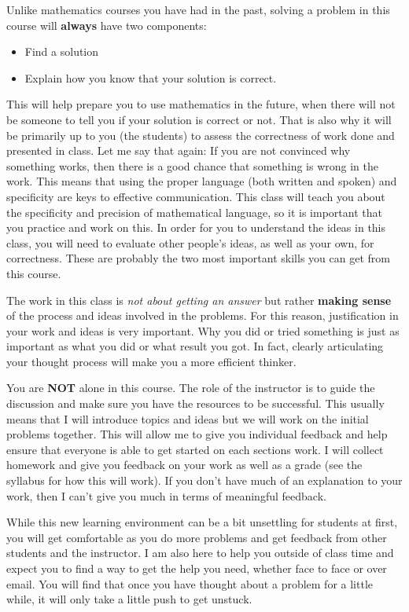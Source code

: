 Unlike mathematics courses you have had in the past, solving a problem in this course will \textbf{always} have two components:
\begin{itemize}
\item Find a solution
\item Explain how you know that your solution is correct.
\end{itemize}
This will help prepare you to use mathematics in the future, when there will not be someone to tell you if your solution is correct or not. That is also why it will be primarily up to you (the students) to assess the correctness of work done and presented in class. Let me say that again: If you are not convinced why something works, then there is a good chance that something is wrong in the work. This means that using the proper language (both written and spoken) and specificity are keys to effective communication. This class will teach you about the specificity and precision of mathematical language, so it is important that you practice and work on this. In order for you to understand the ideas in this class, you will need to evaluate other people's ideas, as well as your own, for correctness. These are probably the two most important skills you can get from this course.

The work in this class is \emph{not about getting an answer} but rather \textbf{making sense} of the process and ideas involved in the problems. For this reason, justification in your work and ideas is very important. Why you did or tried something is just as important as what you did or what result you got. In fact, clearly articulating your thought process will make you a more efficient thinker.

You are \textbf{NOT} alone in this course. The role of the instructor is to guide the discussion and make sure you have the resources to be successful. This usually means that I will introduce topics and ideas but we will work on the initial problems together. This will allow me to give you individual feedback and help ensure that everyone is able to get started on each sections work. I will collect homework and give you feedback on your work as well as a grade (see the syllabus for how this will work). If you don't have much of an explanation to your work, then I can't give you much in terms of meaningful feedback.

While this new learning environment can be a bit unsettling for students at first, you will get comfortable as you do more problems and get feedback from other students and the instructor. I am also here to help you outside of class time and expect you to find a way to get the help you need, whether face to face or over email. You will find that once you have thought about a problem for a little while, it will only take a little push to get unstuck.

